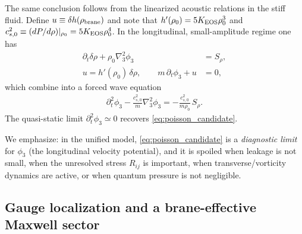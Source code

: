 \documentclass[11pt]{article}
\begin{document}
The same conclusion follows from the linearized acoustic relations in the stiff
fluid.  Define $u\equiv\delta h(\rho_{\rm brane})$ and note that
$h'(\rho_0)=5K_{\rm EOS}\rho_0^3$ and $c_{s,0}^2\equiv (dP/d\rho)|_{\rho_0}=5K_{\rm EOS}\rho_0^4$.
In the longitudinal, small-amplitude regime one has
\begin{align}
\partial_t \delta\rho + \rho_0 \nabla_3^2 \phi_3 &= S_\rho,\\
u = h'(\rho_0)\,\delta\rho, \qquad
m\,\partial_t \phi_3 + u &= 0,
\end{align}
which combine into a forced wave equation
\begin{align}
\partial_t^2 \phi_3 - \frac{c_{s,0}^2}{m}\nabla_3^2 \phi_3
= -\frac{c_{s,0}^2}{m\rho_0}\,S_\rho.
\label{eq:forced_wave_phi}
\end{align}
The quasi-static limit $\partial_t^2\phi_3\simeq 0$ recovers
\eqref{eq:poisson_candidate}.

We emphasize: in the unified model, \eqref{eq:poisson_candidate} is a
\emph{diagnostic limit} for $\phi_3$ (the longitudinal velocity potential), and
it is spoiled when leakage is not small, when the unresolved stress $R_{ij}$ is
important, when transverse/vorticity dynamics are active, or when quantum
pressure is not negligible.

\subsection{Gauge localization and a brane-effective Maxwell sector}
\label{sec:em_reduction}
\end{document}
